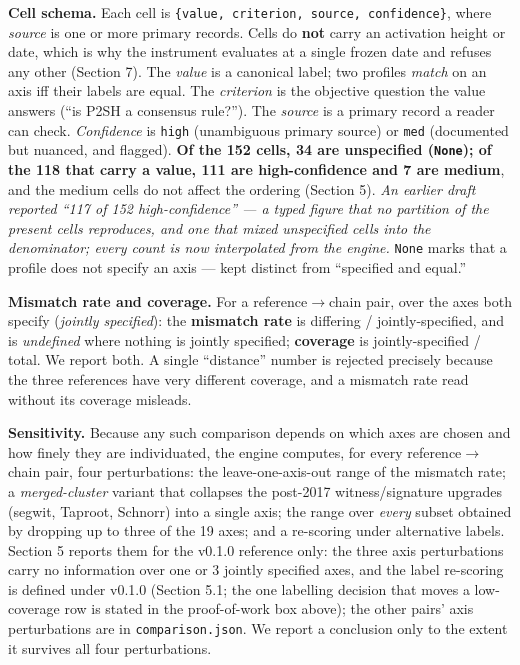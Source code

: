 \documentclass[
]{article}
\begin{document}
\textbf{Cell schema.} Each cell is
\texttt{\{value,\ criterion,\ source,\ confidence\}}, where
\emph{source} is one or more primary records. Cells do \textbf{not}
carry an activation height or date, which is why the instrument
evaluates at a single frozen date and refuses any other (Section 7). The
\emph{value} is a canonical label; two profiles \emph{match} on an axis
iff their labels are equal. The \emph{criterion} is the objective
question the value answers (``is P2SH a consensus rule?''). The
\emph{source} is a primary record a reader can check. \emph{Confidence}
is \texttt{high} (unambiguous primary source) or \texttt{med}
(documented but nuanced, and flagged). \textbf{Of the 152 cells, 34 are
unspecified (\texttt{None}); of the 118 that carry a value, 111 are
high-confidence and 7 are medium}, and the medium cells do not affect
the ordering (Section 5). \emph{An earlier draft reported ``117 of 152
high-confidence'' --- a typed figure that no partition of the present
cells reproduces, and one that mixed unspecified cells into the
denominator; every count is now interpolated from the engine.}
\texttt{None} marks that a profile does not specify an axis --- kept
distinct from ``specified and equal.''

\textbf{Mismatch rate and coverage.} For a reference\(\rightarrow\)chain
pair, over the axes both specify (\emph{jointly specified}): the
\textbf{mismatch rate} is differing / jointly-specified, and is
\emph{undefined} where nothing is jointly specified; \textbf{coverage}
is jointly-specified / total. We report both. A single ``distance''
number is rejected precisely because the three references have very
different coverage, and a mismatch rate read without its coverage
misleads.

\textbf{Sensitivity.} Because any such comparison depends on which axes
are chosen and how finely they are individuated, the engine computes,
for every reference\(\rightarrow\)chain pair, four perturbations: the
leave-one-axis-out range of the mismatch rate; a \emph{merged-cluster}
variant that collapses the post-2017 witness/signature upgrades (segwit,
Taproot, Schnorr) into a single axis; the range over \emph{every} subset
obtained by dropping up to three of the 19 axes; and a re-scoring under
alternative labels. Section 5 reports them for the v0.1.0 reference
only: the three axis perturbations carry no information over one or 3
jointly specified axes, and the label re-scoring is defined under v0.1.0
(Section 5.1; the one labelling decision that moves a low-coverage row
is stated in the proof-of-work box above); the other pairs' axis
perturbations are in \texttt{comparison.json}. We report a conclusion
only to the extent it survives all four perturbations.
\end{document}
